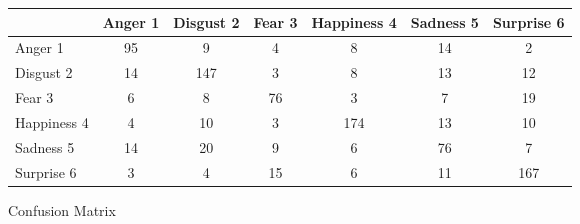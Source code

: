 \begin{figure}[h]
  \begin{center}
    \caption{Confusion Matrix}
    \begin{tabular}{ | l || c | c | c | c | c | c | }
    \hline
          & Anger 1 & Disgust 2 & Fear 3 & Happiness 4 & Sadness 5 & Surprise 6 \\ \hline \hline
        Anger 1 & 95 & 9 & 4 & 8 & 14 & 2 \\ \hline
        Disgust 2 & 14 & 147 & 3 & 8 & 13 & 12 \\ \hline
        Fear 3 & 6 & 8 & 76 & 3 & 7 & 19 \\ \hline
        Happiness 4 & 4 & 10 & 3 & 174 & 13 & 10 \\ \hline
        Sadness 5 & 14 & 20 & 9 & 6 & 76 & 7 \\ \hline
        Surprise 6 & 3 & 4 & 15 & 6 & 11 & 167 \\ \hline
    \end{tabular}
    \label{fig:confusionMatrix}
\end{center}
\end{figure}
